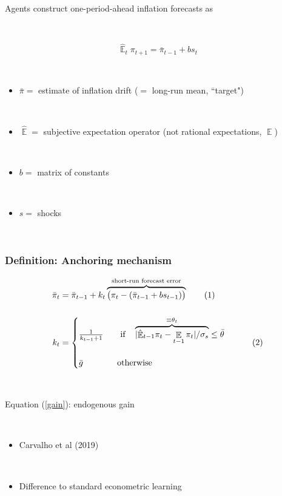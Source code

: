 \documentclass{beamer}
\DeclareMathOperator{\E}{\mathbb{E}}
\newcommand\numberthis{\addtocounter{equation}{1}\tag{\theequation}} %
\begin{document}
\begin{frame}
	\frametitle{}

Agents construct one-period-ahead inflation forecasts as

\

\begin{equation}
\hat{\E}_{t}\pi_{t+1} =  \bar{\pi}_{t-1}+bs_{t}
\end{equation}

\

\begin{itemize}
\item[] $\bar{\pi} =$ estimate of inflation drift ($=$ long-run mean, ``target")

\



\item[] $\hat{\E} =$ subjective expectation operator (not rational expectations, $\E$)

\



\item[] $b =$ matrix of constants 

\

\item[] $s =$ shocks
\end{itemize}

\



\end{frame}

\begin{frame}
	\frametitle{Definition: Anchoring mechanism}
	
 \begin{align*}
\bar{\pi}_{t} & = \bar{\pi}_{t-1} +k_t\overbrace{\big(\pi_{t} -(\bar{\pi}_{t-1}+bs_{t-1}) \big)}^{\text{short-run forecast error}}  \label{RLS_anchoring} \numberthis \\
\\
k_t &= \begin{cases}  \frac{1}{k_{t-1} +1} \quad \quad \text{if} \quad \overbrace{|\hat{\E}_{t-1}\pi_t - \E_{t-1}\pi_t| / \sigma_s}^{\equiv \theta_t} \leq \bar{\theta} \\ \\\bar{g} \quad \quad \quad \quad \text{otherwise}\end{cases} \label{gain} \numberthis
\end{align*}

\

Equation (\ref{gain}): endogenous gain

\

\begin{itemize}
\item Carvalho et al (2019)

\

\item Difference to standard econometric learning
\end{itemize}


\end{frame}
\end{document}
